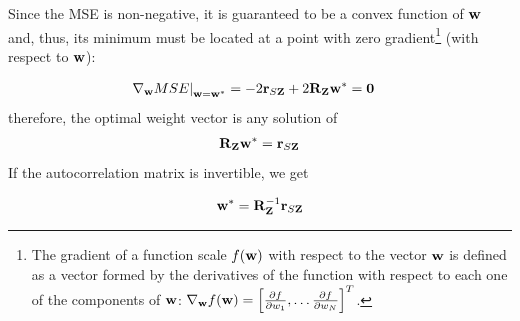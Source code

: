 Since the MSE is non-negative, it is guaranteed to be a convex function of ${\bf w}$ and, thus, its minimum must be located at a point with zero gradient\footnote{The gradient of a function scale $f({\bf w})$ with respect to the vector ${\bf w}$ is defined as a vector formed by the derivatives of the function with respect to each one of the components of $\bf w$: $\nabla_{{\bf w}} f({\bf w}) = \left[\frac{\partial f}{\partial w_1}, \dots \frac{\partial f}{\partial w_N}\right]^T$.} (with respect to ${\bf w}$):
{\begin{align}
\label{ec:ecs_normales_1}
\left. \nabla_{\bf w} MSE \right|_{{\bf w} = {\bf w}^*} 
 &= -2 {\bf r}_{S{\bf Z}} + 2 {\bf R}_{\bf Z} {\bf w}^* 
  = {\bf 0}
\end{align}
%
%
therefore, the optimal weight vector is any solution of
\begin{align}
\label{ec:ecs_normales_2}
{\bf R}_{\bf Z} {\bf w}^* = {\bf r}_{S{\bf Z}}
\end{align}
If the autocorrelation matrix is invertible, we get
\begin{framed}
\begin{equation}
\label{Est.ec:weopt}
 {\bf w}^* = {{\bf R}_{\bf Z}^{-1}} {\bf r}_{S{\bf Z}} 
\end{equation}
\end{framed}}

